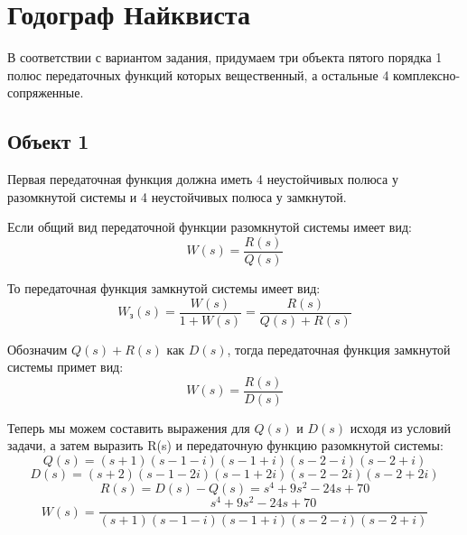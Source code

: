 \chapter{Годограф Найквиста}

В соответствии с вариантом задания, придумаем три объекта пятого порядка 1 полюс передаточных функций которых 
вещественный, а остальные 4 комплексно-сопряженные.

\section{Объект 1}
Первая передаточная функция должна иметь 4 неустойчивых полюса у разомкнутой системы и 4 неустойчивых полюса у замкнутой.

Если общий вид передаточной функции разомкнутой системы имеет вид:
\[
W(s) = \frac{R(s)}{Q(s)}
\]

То передаточная функция замкнутой системы имеет вид:
\[
W_\text{з}(s) = \frac{W(s)}{1 + W(s)} = \frac{R(s)}{Q(s) + R(s)}
\]

Обозначим \(Q(s) + R(s)\) как \(D(s)\), тогда передаточная функция замкнутой системы примет вид:
\[
W(s) = \frac{R(s)}{D(s)}
\]

Теперь мы можем составить выражения для \(Q(s)\) и \(D(s)\) исходя из условий задачи,
а затем выразить R(s) и передаточную функцию разомкнутой системы:
\[
Q(s) = (s+1)(s-1-i)(s-1+i)(s-2-i)(s-2+i)
\]
\[
D(s) = (s+2)(s-1-2i)(s-1+2i)(s-2-2i)(s-2+2i)
\]
\[
R(s) = D(s) - Q(s) = s^4 + 9s^2 - 24s +70
\]
\[
W(s) = \frac{s^4 + 9s^2 - 24s +70}{(s+1)(s-1-i)(s-1+i)(s-2-i)(s-2+i)}
\]

